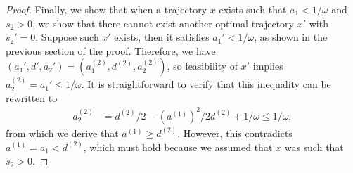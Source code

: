 \documentclass[a4paper]{article}
\theoremstyle{definition}
\theoremstyle{plain}
\begin{document}
\begin{proof}
  Finally, we show that when a trajectory $x$ exists such that
  $a_{1} < 1/\omega$ and $s_{2} > 0$, we show that there cannot exist another
  optimal trajectory $x'$ with $s_{2}' = 0$.
  Suppose such $x'$ exists, then it satisfies $a_{1}' < 1/\omega$, as shown in the
  previous section of the proof. Therefore, we have
  $(a_{1}', d', a_{2}') = (a_{1}^{(2)}, d^{(2)}, a_{2}^{(2)})$, so feasibility
  of $x'$ implies $a_{2}^{(2)} = a_{1}' \leq 1/\omega$.
  It is straightforward to verify that this inequality can be rewritten to
  \begin{align*}
    a_{2}^{(2)} &= d^{(2)}/2 - (a^{(1)})^{2}/2d^{(2)} + 1/\omega  \leq 1/\omega ,
  \end{align*}
  from which we derive that $a^{(1)} \geq d^{(2)}$. However, this contradicts
  $a^{(1)} = a_{1} < d^{(2)}$, which must hold because we assumed that $x$ was such that
  $s_{2} > 0$.
\end{proof}
\end{document}
